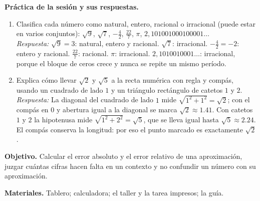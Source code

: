 \documentclass[11pt]{article}
\begin{document}
\textbf{Práctica de la sesión y sus respuestas.}
\begin{enumerate}
  \item Clasifica cada número como natural, entero, racional o irracional (puede estar en
    varios conjuntos): $\sqrt{9}$, $\sqrt{7}$, $-\frac{4}{2}$, $\frac{22}{7}$, $\pi$,
    $2{,}101001000100001\ldots$
    \\\emph{Respuesta:} $\sqrt{9} = 3$: natural, entero y racional. $\sqrt{7}$:
    irracional. $-\frac{4}{2} = -2$: entero y racional. $\frac{22}{7}$: racional. $\pi$:
    irracional. $2{,}1010010001\ldots$: irracional, porque el bloque de ceros crece y
    nunca se repite un mismo período.
  \item Explica cómo llevar $\sqrt{2}$ y $\sqrt{5}$ a la recta numérica con regla y
    compás, usando un cuadrado de lado $1$ y un triángulo rectángulo de catetos $1$ y $2$.
    \\\emph{Respuesta:} La diagonal del cuadrado de lado $1$ mide
    $\sqrt{1^2 + 1^2} = \sqrt{2}$; con el compás en $0$ y abertura igual a la diagonal se
    marca $\sqrt{2} \approx \num{1,41}$. Con catetos $1$ y $2$ la hipotenusa mide
    $\sqrt{1^2 + 2^2} = \sqrt{5}$, que se lleva igual hasta $\sqrt{5} \approx \num{2,24}$.
    El compás conserva la longitud: por eso el punto marcado es exactamente $\sqrt{2}$.
\end{enumerate}


\textbf{Objetivo.} Calcular el error absoluto y el error relativo de una aproximación,
juzgar cuántas cifras hacen falta en un contexto y no confundir un número con su
aproximación.

\textbf{Materiales.} Tablero; calculadora; el taller y la tarea impresos; la guía.
\end{document}
